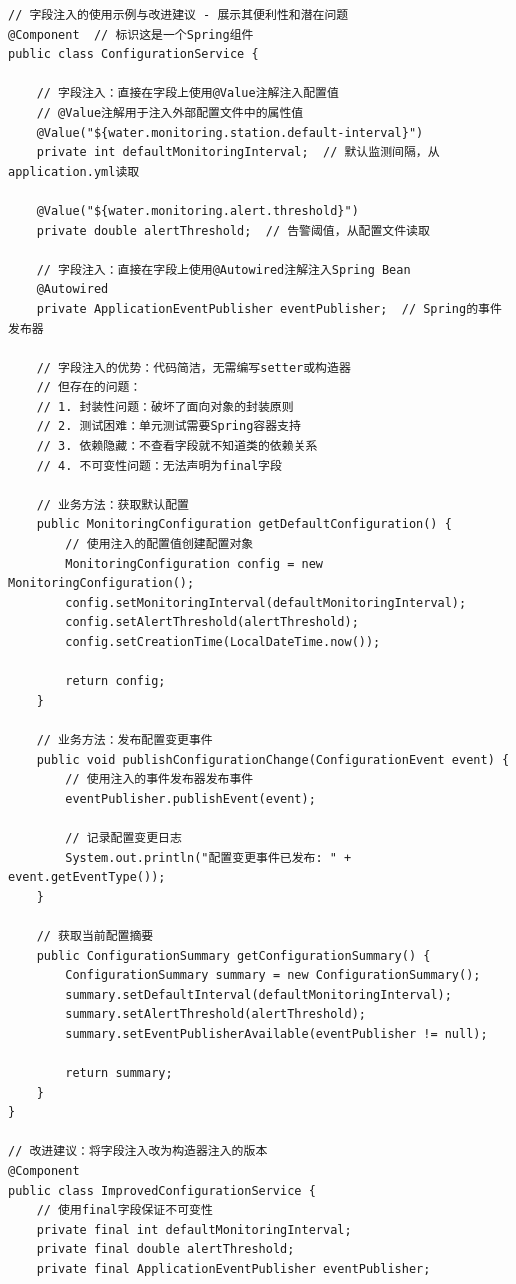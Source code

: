 \begin{lstlisting}[style=java]
// 字段注入的使用示例与改进建议 - 展示其便利性和潜在问题
@Component  // 标识这是一个Spring组件
public class ConfigurationService {
    
    // 字段注入：直接在字段上使用@Value注解注入配置值
    // @Value注解用于注入外部配置文件中的属性值
    @Value("${water.monitoring.station.default-interval}")  
    private int defaultMonitoringInterval;  // 默认监测间隔，从application.yml读取
    
    @Value("${water.monitoring.alert.threshold}")  
    private double alertThreshold;  // 告警阈值，从配置文件读取
    
    // 字段注入：直接在字段上使用@Autowired注解注入Spring Bean
    @Autowired
    private ApplicationEventPublisher eventPublisher;  // Spring的事件发布器
    
    // 字段注入的优势：代码简洁，无需编写setter或构造器
    // 但存在的问题：
    // 1. 封装性问题：破坏了面向对象的封装原则
    // 2. 测试困难：单元测试需要Spring容器支持
    // 3. 依赖隐藏：不查看字段就不知道类的依赖关系
    // 4. 不可变性问题：无法声明为final字段
    
    // 业务方法：获取默认配置
    public MonitoringConfiguration getDefaultConfiguration() {
        // 使用注入的配置值创建配置对象
        MonitoringConfiguration config = new MonitoringConfiguration();
        config.setMonitoringInterval(defaultMonitoringInterval);
        config.setAlertThreshold(alertThreshold);
        config.setCreationTime(LocalDateTime.now());
        
        return config;
    }
    
    // 业务方法：发布配置变更事件
    public void publishConfigurationChange(ConfigurationEvent event) {
        // 使用注入的事件发布器发布事件
        eventPublisher.publishEvent(event);
        
        // 记录配置变更日志
        System.out.println("配置变更事件已发布: " + event.getEventType());
    }
    
    // 获取当前配置摘要
    public ConfigurationSummary getConfigurationSummary() {
        ConfigurationSummary summary = new ConfigurationSummary();
        summary.setDefaultInterval(defaultMonitoringInterval);
        summary.setAlertThreshold(alertThreshold);
        summary.setEventPublisherAvailable(eventPublisher != null);
        
        return summary;
    }
}

// 改进建议：将字段注入改为构造器注入的版本
@Component
public class ImprovedConfigurationService {
    // 使用final字段保证不可变性
    private final int defaultMonitoringInterval;
    private final double alertThreshold;
    private final ApplicationEventPublisher eventPublisher;
    

\end{lstlisting}
